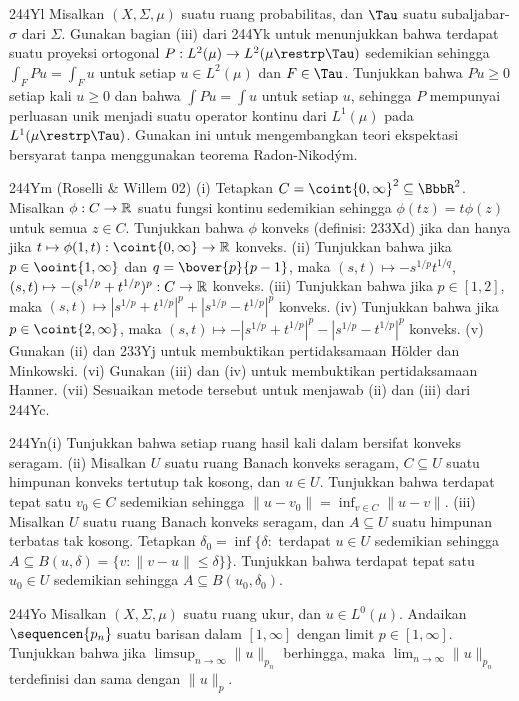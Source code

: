 {\spheader 244Yl
Misalkan $(X,\Sigma,\mu)$ suatu ruang probabilitas, dan $\Tau$ suatu
subaljabar-$\sigma$ dari $\Sigma$. Gunakan bagian (iii) dari 244Yk untuk
menunjukkan bahwa terdapat suatu proyeksi ortogonal
$P:L^2(\mu)\to L^2(\mu\restrp\Tau)$ sedemikian sehingga
$\int_FPu=\int_Fu$ untuk setiap $u\in L^2(\mu)$ dan $F\in\Tau$.
Tunjukkan bahwa $Pu\ge 0$ setiap kali $u\ge 0$ dan bahwa
$\int Pu=\int u$ untuk setiap $u$, sehingga $P$ mempunyai perluasan unik
menjadi suatu operator kontinu dari $L^1(\mu)$ pada
$L^1(\mu\restrp\Tau)$. Gunakan ini untuk mengembangkan teori ekspektasi
bersyarat tanpa menggunakan teorema Radon-Nikod\'ym.

\spheader 244Ym ({\smc Roselli \& Willem 02})
(i) Tetapkan $C=\coint{0,\infty}^2\subseteq\BbbR^2$. Misalkan
$\phi:C\to\Bbb R$ suatu fungsi kontinu sedemikian sehingga
$\phi(tz)=t\phi(z)$ untuk semua $z\in C$.
Tunjukkan bahwa $\phi$ konveks (definisi: 233Xd) jika dan hanya jika
$t\mapsto\phi(1,t):\coint{0,\infty}\to\Bbb R$ konveks.
(ii) Tunjukkan bahwa jika $p\in\ooint{1,\infty}$ dan
$q=\bover{p}{p-1}$, maka $(s,t)\mapsto -s^{1/p}t^{1/q}$,
$(s,t)\mapsto -(s^{1/p}+t^{1/p})^p:C\to\Bbb R$ konveks.
(iii) Tunjukkan bahwa jika $p\in[1,2]$, maka
$(s,t)\mapsto|s^{1/p}+t^{1/p}|^p+|s^{1/p}-t^{1/p}|^p$ konveks.
(iv) Tunjukkan bahwa jika $p\in\coint{2,\infty}$, maka
$(s,t)\mapsto -|s^{1/p}+t^{1/p}|^p-|s^{1/p}-t^{1/p}|^p$ konveks.
(v) Gunakan (ii) dan 233Yj untuk membuktikan pertidaksamaan H\"older dan
Minkowski. (vi) Gunakan (iii) dan (iv) untuk membuktikan pertidaksamaan
Hanner. (vii) Sesuaikan metode tersebut untuk menjawab (ii) dan (iii)
dari 244Yc.

\spheader 244Yn(i) Tunjukkan bahwa setiap ruang hasil kali
dalam bersifat konveks seragam.
(ii) Misalkan $U$ suatu ruang Banach konveks seragam,
$C\subseteq U$ suatu himpunan konveks tertutup tak kosong, dan $u\in U$.
Tunjukkan bahwa terdapat tepat satu $v_0\in C$ sedemikian sehingga
$\|u-v_0\|=\inf_{v\in C}\|u-v\|$.
(iii) Misalkan $U$ suatu ruang Banach konveks seragam, dan
$A\subseteq U$ suatu himpunan terbatas tak kosong. Tetapkan
$\delta_0=\inf\{\delta:$ terdapat $u\in U$ sedemikian sehingga
$A\subseteq B(u,\delta)=\{v:\|v-u\|\le\delta\}\}$. Tunjukkan bahwa
terdapat tepat satu $u_0\in U$ sedemikian sehingga
$A\subseteq B(u_0,\delta_0)$.

\spheader 244Yo Misalkan $(X,\Sigma,\mu)$ suatu ruang ukur,
dan $u\in L^0(\mu)$. Andaikan $\sequencen{p_n}$ suatu barisan dalam
$[1,\infty]$ dengan limit $p\in[1,\infty]$. Tunjukkan bahwa jika
$\limsup_{n\to\infty}\|u\|_{p_n}$ berhingga, maka
$\lim_{n\to\infty}\|u\|_{p_n}$ terdefinisi dan sama dengan $\|u\|_p$.
}%


